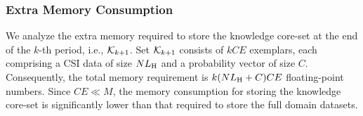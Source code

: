 \subsubsection{Extra Memory Consumption}
We analyze the extra memory required to store the knowledge core-set at the end of the $k$-th period, i.e., $\mathcal{K}_{k+1}$.
Set $\mathcal{K}_{k+1}$ consists of $kCE$ exemplars, each comprising a CSI data of size $NL_{\mathrm{H}}$ and a probability vector of size $C$. 
Consequently, the total memory requirement is $k(NL_{\mathrm{H}} + C)CE$ floating-point numbers.
Since $CE \ll M$, the memory consumption for storing the knowledge core-set is significantly lower than that required to store the full domain datasets.
\endinput